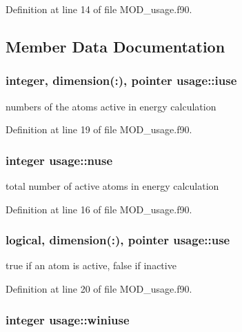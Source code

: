 Definition at line 14 of file M\-O\-D\-\_\-usage.\-f90.



\subsection{Member Data Documentation}
\hypertarget{classusage_a5c6391c4e668a32b98af9eabbdca1929}{
\subsubsection[{iuse}]{\setlength{\rightskip}{0pt plus 5cm}integer, dimension(\-:), pointer usage\-::iuse}}\label{classusage_a5c6391c4e668a32b98af9eabbdca1929}


numbers of the atoms active in energy calculation 



Definition at line 19 of file M\-O\-D\-\_\-usage.\-f90.

\hypertarget{classusage_a18dcb00c2697908dd9b95b1e8eba2572}{
\subsubsection[{nuse}]{\setlength{\rightskip}{0pt plus 5cm}integer usage\-::nuse}}\label{classusage_a18dcb00c2697908dd9b95b1e8eba2572}


total number of active atoms in energy calculation 



Definition at line 16 of file M\-O\-D\-\_\-usage.\-f90.

\hypertarget{classusage_ab4b5e3df6933910ff79c30d99fafef53}{
\subsubsection[{use}]{\setlength{\rightskip}{0pt plus 5cm}logical, dimension(\-:), pointer usage\-::use}}\label{classusage_ab4b5e3df6933910ff79c30d99fafef53}


true if an atom is active, false if inactive 



Definition at line 20 of file M\-O\-D\-\_\-usage.\-f90.

\hypertarget{classusage_a013f1f4b2ce00f6ff02c870769bf0271}{
\subsubsection[{winiuse}]{\setlength{\rightskip}{0pt plus 5cm}integer usage\-::winiuse}}\label{classusage_a013f1f4b2ce00f6ff02c870769bf0271}


